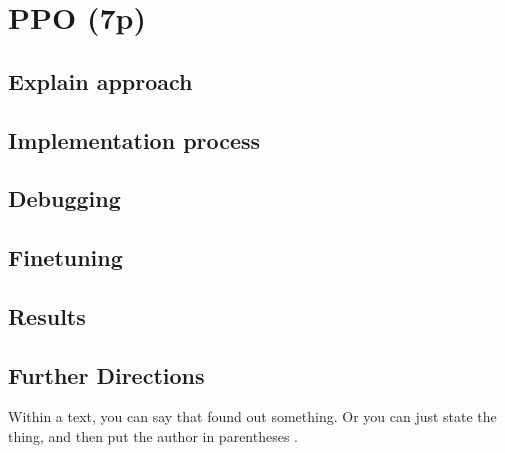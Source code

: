 \section{PPO (7p)}

\subsection{Explain approach}

\subsection{Implementation process}


\subsection{Debugging}

\subsection{Finetuning}

\subsection{Results}

\subsection{Further Directions}

Within a text, you can say that \citet{lin2001} found out something. Or you can just state the thing, and then put the author in parentheses \citep[see][]{szpektor2004}.

